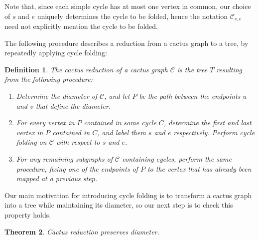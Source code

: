\documentclass{mpaper}
\newtheorem{theorem}{Theorem}[section]
\newtheorem{definition}[theorem]{Definition}
\begin{document}
Note that, since each simple cycle has at most one vertex in common, our choice of $s$ and $e$ uniquely determines the cycle to be folded, hence the notation $\mathcal{C}_{s,e}$ need not explicitly mention the cycle to be folded.

The following procedure describes a reduction from a cactus graph to a tree, by repeatedly applying cycle folding:

\begin{definition}
  The \emph{cactus reduction} of a cactus graph $\mathcal{C}$ is the tree $T$ resulting from the following procedure:

  \begin{enumerate}
    \item Determine the diameter of $\mathcal{C}$, and let $P$ be the path between the endpoints $u$ and $v$ that define the diameter.
    \item For every vertex in $P$ contained in some cycle $C$, determine the first and last vertex in $P$ contained in $C$, and label them $s$ and $e$ respectively. Perform cycle folding on $\mathcal{C}$ with respect to $s$ and $e$.
    \item For any remaining subgraphs of $\mathcal{C}$ containing cycles, perform the same procedure, fixing one of the endpoints of $P$ to the vertex that has already been mapped at a previous step.
  \end{enumerate}
\end{definition}

Our main motivation for introducing cycle folding is to transform a cactus graph into a tree while maintaining its diameter, so our next step is to check this property holds.

\begin{theorem}
  \label{thm/cactus-reduction-diameter}
Cactus reduction preserves diameter.
\end{theorem}
\end{document}
